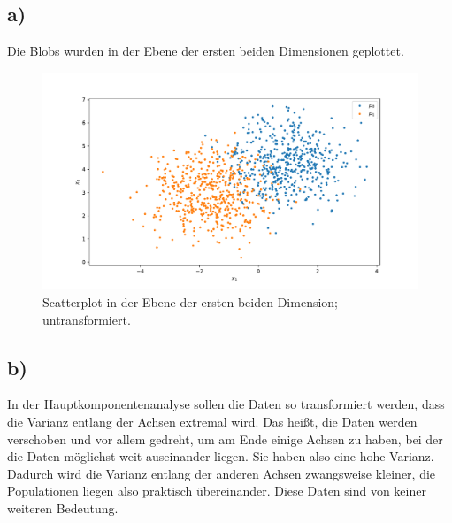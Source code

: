 \documentclass[a4paper, 11pt]{article}
\begin{document}
\subsection*{a)}
Die Blobs wurden in der Ebene der ersten beiden Dimensionen geplottet.
\begin{figure}
    \centering
    \includegraphics[width=\textwidth]{../A18/A18_scatter.pdf}
    \caption{Scatterplot in der Ebene der ersten beiden Dimension; untransformiert.}
    \label{fig:A18_scatter}
\end{figure}
\FloatBarrier

\subsection*{b)}
In der Hauptkomponentenanalyse sollen die Daten so transformiert werden, dass die Varianz entlang der Achsen extremal wird.
Das heißt, die Daten werden verschoben und vor allem gedreht, um am Ende einige Achsen zu haben, bei der die Daten möglichst weit auseinander liegen.
Sie haben also eine hohe Varianz.
Dadurch wird die Varianz entlang der anderen Achsen zwangsweise kleiner, die Populationen liegen also praktisch übereinander.
Diese Daten sind von keiner weiteren Bedeutung.
\end{document}
